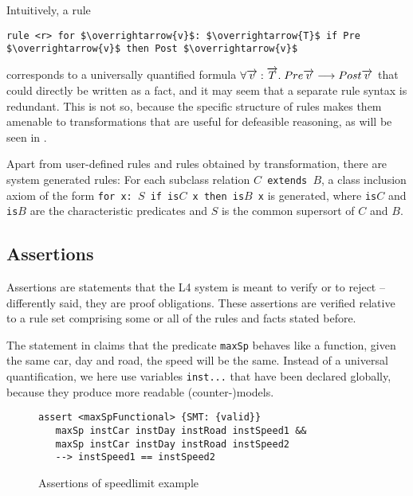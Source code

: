 Intuitively, a rule

\begin{lstlisting}[frame=none,mathescape=true]
  rule <r> for $\overrightarrow{v}$: $\overrightarrow{T}$ if Pre $\overrightarrow{v}$ then Post $\overrightarrow{v}$
\end{lstlisting}
corresponds to a universally quantified formula
$\forall \overrightarrow{v} : \overrightarrow{T}.\; Pre \overrightarrow{v}
\longrightarrow Post \overrightarrow{v}$ that could directly be written as a fact,
and it may seem that a separate rule syntax is redundant. This is not so,
because the specific structure of rules makes them amenable to transformations
that are useful for defeasible reasoning, as will be seen in .

Apart from user-defined rules and rules obtained by transformation, there are
system generated rules: For each subclass relation \texttt{$C$ extends $B$}, a
class inclusion axiom of the form \texttt{for x: $S$ if is$C$ x then is$B$ x}
is generated, where \texttt{is$C$} and \texttt{is$B$} are the characteristic
predicates and $S$ is the common supersort of $C$ and $B$.


\subsection{Assertions}\label{sec:assertions}


Assertions are statements that the L4 system is meant to verify or to
reject -- differently said, they are proof obligations. These assertions are verified
relative to a rule set comprising some or all of the rules and facts stated
before. 

The statement in  claims that the predicate
\texttt{maxSp} behaves like a function, \ie{} given the same car, day and
road, the speed will be the same. Instead of a universal quantification, we
here use variables \texttt{inst...} that have been declared globally, because they
produce more readable (counter-)models. 

\begin{figure}[h]

\begin{lstlisting}
assert <maxSpFunctional> {SMT: {valid}}
   maxSp instCar instDay instRoad instSpeed1 &&
   maxSp instCar instDay instRoad instSpeed2
   --> instSpeed1 == instSpeed2
\end{lstlisting}

  \caption{Assertions of speedlimit example}\label{fig:assertions}
\end{figure}

